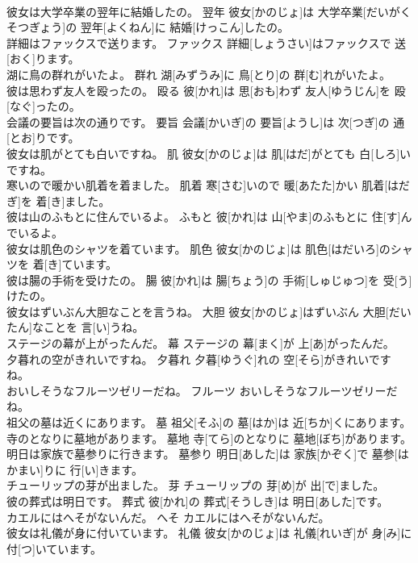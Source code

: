 \documentclass[8pt]{extreport}
\begin{document}
\begin{CJK}{UTF8}{min}
\\	彼女は大学卒業の翌年に結婚したの。	翌年	彼女[かのじょ]は 大学卒業[だいがく そつぎょう]の 翌年[よくねん]に 結婚[けっこん]したの。	
\\	詳細はファックスで送ります。	ファックス	詳細[しょうさい]はファックスで 送[おく]ります。	
\\	湖に鳥の群れがいたよ。	群れ	湖[みずうみ]に 鳥[とり]の 群[む]れがいたよ。	
\\	彼は思わず友人を殴ったの。	殴る	彼[かれ]は 思[おも]わず 友人[ゆうじん]を 殴[なぐ]ったの。	
\\	会議の要旨は次の通りです。	要旨	会議[かいぎ]の 要旨[ようし]は 次[つぎ]の 通[とお]りです。	
\\	彼女は肌がとても白いですね。	肌	彼女[かのじょ]は 肌[はだ]がとても 白[しろ]いですね。	
\\	寒いので暖かい肌着を着ました。	肌着	寒[さむ]いので 暖[あたた]かい 肌着[はだぎ]を 着[き]ました。	
\\	彼は山のふもとに住んでいるよ。	ふもと	彼[かれ]は 山[やま]のふもとに 住[す]んでいるよ。	
\\	彼女は肌色のシャツを着ています。	肌色	彼女[かのじょ]は 肌色[はだいろ]のシャツを 着[き]ています。	
\\	彼は腸の手術を受けたの。	腸	彼[かれ]は 腸[ちょう]の 手術[しゅじゅつ]を 受[う]けたの。	
\\	彼女はずいぶん大胆なことを言うね。	大胆	彼女[かのじょ]はずいぶん 大胆[だいたん]なことを 言[い]うね。	
\\	ステージの幕が上がったんだ。	幕	ステージの 幕[まく]が 上[あ]がったんだ。	
\\	夕暮れの空がきれいですね。	夕暮れ	夕暮[ゆうぐ]れの 空[そら]がきれいですね。	
\\	おいしそうなフルーツゼリーだね。	フルーツ	おいしそうなフルーツゼリーだね。	
\\	祖父の墓は近くにあります。	墓	祖父[そふ]の 墓[はか]は 近[ちか]くにあります。	
\\	寺のとなりに墓地があります。	墓地	寺[てら]のとなりに 墓地[ぼち]があります。	
\\	明日は家族で墓参りに行きます。	墓参り	明日[あした]は 家族[かぞく]で 墓参[はかまい]りに 行[い]きます。	
\\	チューリップの芽が出ました。	芽	チューリップの 芽[め]が 出[で]ました。	
\\	彼の葬式は明日です。	葬式	彼[かれ]の 葬式[そうしき]は 明日[あした]です。	
\\	カエルにはへそがないんだ。	へそ	カエルにはへそがないんだ。	
\\	彼女は礼儀が身に付いています。	礼儀	彼女[かのじょ]は 礼儀[れいぎ]が 身[み]に 付[つ]いています。	

\end{CJK}
\end{document}
